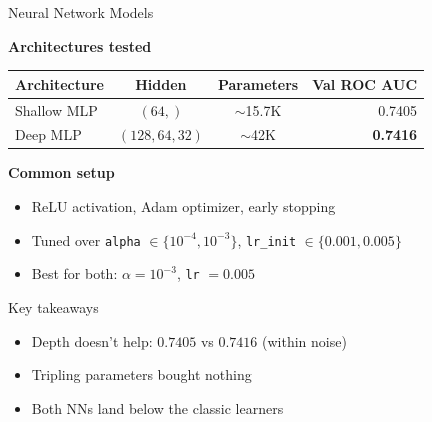 \documentclass[aspectratio=169,11pt]{beamer}
\newcommand{\hp}[1]{{\color{primary}\textbf{#1}}}
\begin{document}
\begin{frame}{Neural Network Models}

\scriptsize

\textbf{Architectures tested}
\begin{tabularx}{\textwidth}{@{}l c c r@{}}
    \toprule
    \hp{Architecture}     & \hp{Hidden}      & \hp{Parameters}  & \hp{Val ROC AUC} \\
    \midrule
    Shallow MLP           & $(64,)$          & $\sim$15.7K      & 0.7405 \\
    Deep MLP              & $(128, 64, 32)$  & $\sim$42K        & \textbf{0.7416} \\
    \bottomrule
\end{tabularx}

\textbf{Common setup}
\begin{itemize}
    \item ReLU activation, Adam optimizer, early stopping
    \item Tuned over \texttt{alpha} $\in \{10^{-4}, 10^{-3}\}$, \texttt{lr\_init} $\in \{0.001, 0.005\}$
    \item Best for both: $\alpha = 10^{-3}$, \texttt{lr} $= 0.005$
\end{itemize}

\begin{block}{Key takeaways}
\begin{itemize}
    \item Depth doesn't help: $0.7405$ vs $0.7416$ (within noise)
    \item Tripling parameters bought nothing
    \item Both NNs land below the classic learners
\end{itemize}
\end{block}

\end{frame}
\end{document}
